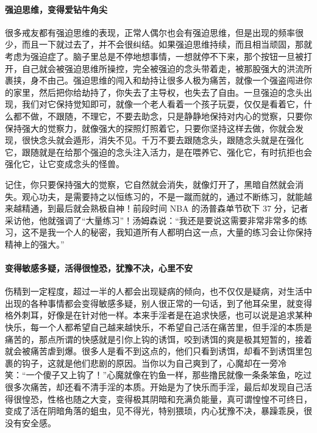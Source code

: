 \paragraph{强迫思维，变得爱钻牛角尖}

很多戒友都有强迫思维的表现，正常人偶尔也会有强迫思维，但是出现的频率很少，而且一下就过去了，并不会很纠结。如果强迫思维持续，而且相当顽固，那就考虑为强迫症了。脑子里总是不停地想事情，一想就停不下来，那个按钮一旦被打开，自己就会被强迫思维所操控，完全被强迫的念头带着走，被那股强大的洪流所裹挟，身不由己。强迫思维的闯入和劫持让很多人极为痛苦，就像一个强盗闯进你的家里，然后把你给劫持了，你失去了主导权，也失去了自由。一旦强迫的念头出现，我们对它保持觉知即可，就像一个老人看着一个孩子玩耍，仅仅是看着它，什么都不做，不跟随，不理它，不要去助念，只是静静地保持对内心的觉察，只要你保持强大的觉察力，就像强大的探照灯照着它，只要你坚持这样去做，你就会发现，很快念头就会遁形，消失不见。千万不要去跟随念头，跟随念头就是在强化它，跟随就是在给那个强迫的念头注入活力，是在喂养它、强化它，有时抗拒也会强化它，让它变成念头的怪兽。

记住，你只要保持强大的觉察，它自然就会消失，就像灯开了，黑暗自然就会消失。观心功夫，是需要持之以恒练习的，不是一蹴而就的，通过不断练习，就能越来越精通，到最后就会熟极自神！前段时间 NBA 的汤普森单节砍下 37 分，记者采访他，他就强调了“大量练习”！汤姆森说：“我还是要说这需要非常非常多的练习，这不是我一个人的秘密，我知道所有人都明白这一点，大量的练习会让你保持精神上的强大。”

\paragraph{变得敏感多疑，活得很惶恐，犹豫不决，心里不安}

伤精到一定程度，超过一半的人都会出现疑病的倾向，也不仅仅是疑病，对生活中出现的各种事情都会变得敏感多疑，别人很正常的一句话，到了他耳朵里，就变得格外刺耳，好像是在针对他一样。本来手淫者是在追求快感，也可以说是追求某种快乐，每一个人都希望自己越来越快乐，不希望自己活在痛苦里，但手淫的本质是痛苦的，那点所谓的快感就是引你上钩的诱饵，咬到诱饵的爽是极其短暂的，接着就会被痛苦虐到爆。很多人是看不到这点的，他们只看到诱饵，却看不到诱饵里包裹的钩子，这就是他们悲剧的原因。当你以为自己爽到了，心魔却在一旁冷笑：“一个傻子又上钩了！”心魔就像在钓鱼一样，那些撸民就像一条条笨鱼，吃过很多次痛苦，却还看不清手淫的本质。开始是为了快乐而手淫，最后却发现自己活得很惶恐，性格也随之大变，变得极其阴暗和充满负能量，真可谓惶惶不可终日，变成了活在阴暗角落的蛆虫，见不得光，特别猥琐，内心犹豫不决，暴躁乖戾，很没有安全感。

